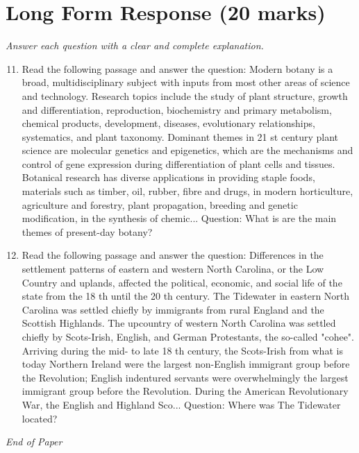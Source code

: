 \documentclass[12pt]{article}
\begin{document}
\section*{Long Form Response (20 marks)}
\textit{Answer each question with a clear and complete explanation.}
\begin{enumerate}[label=\arabic*.]
\setcounter{enumi}{10}
\item Read the following passage and answer the question: Modern botany is a broad, multidisciplinary subject with inputs from most other areas of science and technology. Research topics include the study of plant structure, growth and differentiation, reproduction, biochemistry and primary metabolism, chemical products, development, diseases, evolutionary relationships, systematics, and plant taxonomy. Dominant themes in 21 st century plant science are molecular genetics and epigenetics, which are the mechanisms and control of gene expression during differentiation of plant cells and tissues. Botanical research has diverse applications in providing staple foods, materials such as timber, oil, rubber, fibre and drugs, in modern horticulture, agriculture and forestry, plant propagation, breeding and genetic modification, in the synthesis of chemic... Question: What is are the main themes of present-day botany?
\item Read the following passage and answer the question: Differences in the settlement patterns of eastern and western North Carolina, or the Low Country and uplands, affected the political, economic, and social life of the state from the 18 th until the 20 th century. The Tidewater in eastern North Carolina was settled chiefly by immigrants from rural England and the Scottish Highlands. The upcountry of western North Carolina was settled chiefly by Scots-Irish, English, and German Protestants, the so-called "cohee". Arriving during the mid- to late 18 th century, the Scots-Irish from what is today Northern Ireland were the largest non-English immigrant group before the Revolution; English indentured servants were overwhelmingly the largest immigrant group before the Revolution. During the American Revolutionary War, the English and Highland Sco... Question: Where was The Tidewater located?
\end{enumerate}

\vfill
\noindent\textit{End of Paper}
\end{document}
